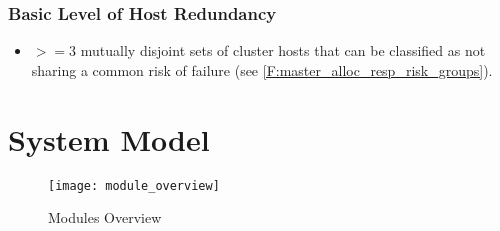 \documentclass[a4paper, 11pt]{article}
\begin{document}
\subsubsection{Basic Level of Host Redundancy}
\begin{itemize}
	\item $>= 3$ mutually disjoint sets of \gls{cluster} \glspl{host} that can be classified as not sharing a common risk of failure (see \ref{F:master_alloc_resp_risk_groups}).
\end{itemize}

\section{System Model}
\begin{figure}[H]
\texttt{[image: module\_overview]}
\caption{\mamid Modules Overview}
\end{figure}
\end{document}
